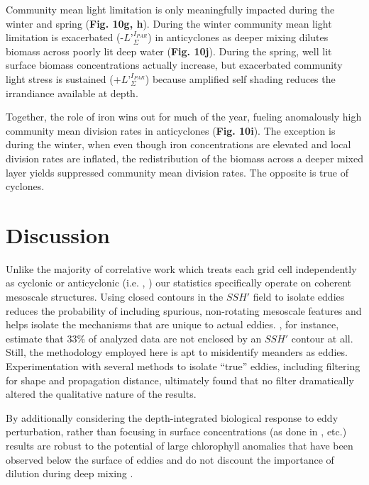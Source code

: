 \documentclass{article}
\begin{document}
Community mean light limitation is only meaningfully impacted during the winter and spring (\textbf{Fig. 10g, h}). During the winter community mean light limitation  is exacerbated (-$L’_\Sigma^{I_{PAR}}$) in anticyclones as deeper mixing dilutes biomass across poorly lit deep water (\textbf{Fig. 10j}). During the spring, well lit surface biomass concentrations actually increase, but exacerbated community light stress is sustained (+$L’_\Sigma^{I_{PAR}}$) because amplified self shading reduces the irrandiance available at depth.  

Together, the role of iron wins out for much of the year, fueling anomalously high community mean division rates in anticyclones (\textbf{Fig. 10i}). The exception is during the winter, when even though iron concentrations are elevated and local division rates are inflated, the redistribution of the biomass across a deeper mixed layer yields suppressed community mean division rates. The opposite is true of cyclones.



\section{Discussion }

Unlike the majority of correlative work which treats each grid cell independently as cyclonic or anticyclonic (i.e. \textcite{GaubeRegionalvariationsinfluence2014}, \textcite{SongSeasonalvariationcorrelation2018}) our statistics specifically operate on coherent mesoscale structures. Using closed contours in the $SSH'$ field to isolate eddies reduces the probability of including spurious, non-rotating mesoscale features and helps isolate the mechanisms that are unique to actual eddies. \textcite{SongSeasonalvariationcorrelation2018}, for instance, estimate that 33\% of analyzed data are not enclosed by an $SSH'$ contour at all. Still, the \textcite{Faghmousdailyglobalmesoscale2015} methodology employed here is apt to misidentify meanders as eddies. Experimentation with several methods to isolate ``true'' eddies, including filtering for shape and propagation distance, ultimately found that no filter dramatically altered the qualitative nature of the results. 

By additionally considering the depth-integrated biological response to eddy perturbation, rather than focusing in surface concentrations (as done in \textcite{Misumiironbudgetocean2014,GaubeRegionalvariationsinfluence2014,FrengerImprintSouthernOcean2018}, etc.) results are robust to the potential of large chlorophyll anomalies that have been observed below the surface of eddies \parencite{SiegelMesoscaleeddiessatellite1999,McGillicuddyEddywindinteractions2007} and do not discount the importance of dilution during deep mixing \parencite{BehrenfeldAnnualcyclesecological2013, RohrVariabilitymechanismscontrolling2017}.
\end{document}
